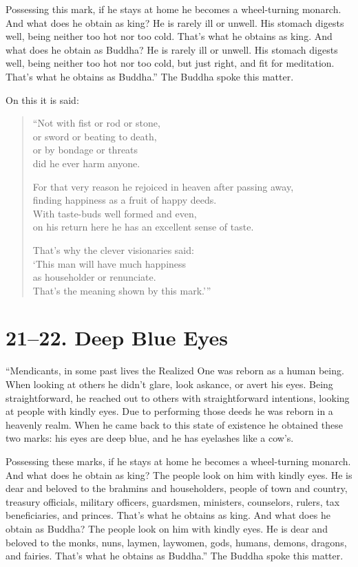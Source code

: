 \documentclass[12pt,openany]{book}%
\begin{document}
Possessing this mark, if he stays at home he becomes a wheel-turning monarch. And what does he obtain as king? He is rarely ill or unwell. His stomach digests well, being neither too hot nor too cold. That’s what he obtains as king. And what does he obtain as Buddha? He is rarely ill or unwell. His stomach digests well, being neither too hot nor too cold, but just right, and fit for meditation. That’s what he obtains as Buddha.” The Buddha spoke this matter. 

On this it is said: 

\begin{verse}%
“Not with fist or rod or stone, \\
or sword or beating to death, \\
or by bondage or threats \\
did he ever harm anyone. 

For that very reason he rejoiced in heaven after passing away, \\
finding happiness as a fruit of happy deeds. \\
With taste-buds well formed and even, \\
on his return here he has an excellent sense of taste. 

That’s why the clever visionaries said: \\
‘This man will have much happiness \\
as householder or renunciate. \\
That’s the meaning shown by this mark.’” 

%
\end{verse}

\section*{21–22. Deep Blue Eyes }

“Mendicants, in some past lives the Realized One was reborn as a human being. When looking at others he didn’t glare, look askance, or avert his eyes. Being straightforward, he reached out to others with straightforward intentions, looking at people with kindly eyes. Due to performing those deeds he was reborn in a heavenly realm. When he came back to this state of existence he obtained these two marks: his eyes are deep blue, and he has eyelashes like a cow’s. 

Possessing these marks, if he stays at home he becomes a wheel-turning monarch. And what does he obtain as king? The people look on him with kindly eyes. He is dear and beloved to the brahmins and householders, people of town and country, treasury officials, military officers, guardsmen, ministers, counselors, rulers, tax beneficiaries, and princes. That’s what he obtains as king. And what does he obtain as Buddha? The people look on him with kindly eyes. He is dear and beloved to the monks, nuns, laymen, laywomen, gods, humans, demons, dragons, and fairies. That’s what he obtains as Buddha.” The Buddha spoke this matter. 
\end{document}
